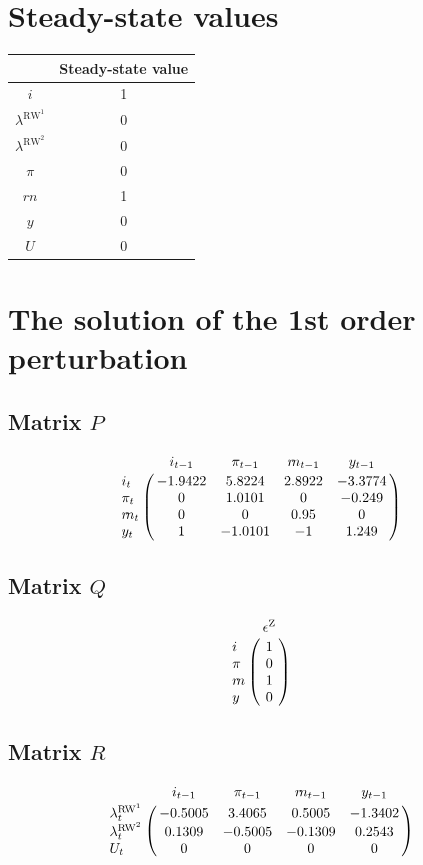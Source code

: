 

\section{Steady-state values}


\begin{tabular}{c|c|}
  & Steady-state value\\
\hline
$i$ & 1 \\
$\lambda^{\mathrm{RW}^{\mathrm{1}}}$ & 0 \\
$\lambda^{\mathrm{RW}^{\mathrm{2}}}$ & 0 \\
$\pi$ & 0 \\
${r\!n}$ & 1 \\
$y$ & 0 \\
$U$ & 0 \\
\hline
\end{tabular}


\section{The solution of the 1st order perturbation}

\subsection*{Matrix $P$}

$$\bordermatrix{
~ & i_{t-1} & \pi_{t-1} & {r\!n}_{t-1} & y_{t-1} \cr
i_{t} & -1.9422 & 5.8224 & 2.8922 & -3.3774 \cr
\pi_{t} & 0 & 1.0101 & 0 & -0.249 \cr
{r\!n}_{t} & 0 & 0 & 0.95 & 0 \cr
y_{t} & 1 & -1.0101 & -1 & 1.249 \cr
}$$

\subsection*{Matrix $Q$}

$$\bordermatrix{
~ & \epsilon^{\mathrm{Z}} \cr
i & 1 \cr
\pi & 0 \cr
{r\!n} & 1 \cr
y & 0 \cr
}$$

\subsection*{Matrix $R$}

$$\bordermatrix{
~ & i_{t-1} & \pi_{t-1} & {r\!n}_{t-1} & y_{t-1} \cr
\lambda^{\mathrm{RW}^{\mathrm{1}}}_{t} & -0.5005 & 3.4065 & 0.5005 & -1.3402 \cr
\lambda^{\mathrm{RW}^{\mathrm{2}}}_{t} & 0.1309 & -0.5005 & -0.1309 & 0.2543 \cr
U_{t} & 0 & 0 & 0 & 0 \cr
}$$

